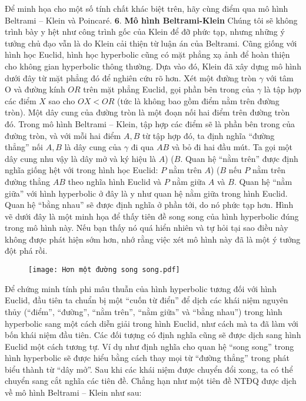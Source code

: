 \documentclass{article}
\begin{document}
	\vskip 0.1cm
	Để minh họa cho một số tính chất khác biệt trên, hãy cùng điểm qua mô hình Beltrami -- Klein và Poincaré.  
	\vskip 0.1cm
	$\pmb{6. }$ \textbf{\color{lichsutoanhoc}Mô hình Beltrami-Klein}
	\vskip 0.1cm
	Chúng tôi sẽ không trình bày y hệt như công trình gốc của Klein để đỡ phức tạp, nhưng những ý tưởng chủ đạo vẫn là do Klein cải thiện từ luận án của Beltrami.
	Cũng giống với hình học Euclid, hình học hyperbolic cũng có mặt phẳng xạ ảnh để hoàn thiện cho không gian hyperbolic thông thường. Dựa vào đó, Klein đã xây dựng mô hình dưới đây từ mặt phẳng đó để nghiên cứu rõ hơn.
	Xét một đường tròn $\gamma$ với tâm O và đường kính $OR$ trên mặt phẳng Euclid, gọi phần bên trong của $ \gamma$ là tập hợp các điểm $X$ sao cho $OX < OR$ (tức là không bao gồm điểm nằm trên đường tròn). Một dây cung của đường tròn là một đoạn nối hai điểm trên đường tròn đó.
	Trong mô hình Beltrami -- Klein, tập hợp các điểm sẽ là phần bên trong của đường tròn, và với mỗi hai điểm $A, B$ từ tập hợp đó, ta định nghĩa ``đường thẳng'' nối $A, B$ là dây cung của $ \gamma$ đi qua $AB$ và bỏ đi hai đầu mút. Ta gọi một dây cung nhu vậy là dây mở và ký hiệu là $A$) ($B$. Quan hệ ``nằm trên'' được định nghĩa giống hệt với trong hình học Euclid: $P$ nằm trên $A$) ($B$ nếu $P$ nằm trên đường thẳng $AB$ theo nghĩa hình Euclid và $P$ nằm giữa $A$ và $B$. Quan hệ ``nằm giữa'' với hình hyperbolic ở đây là y như quan hệ nằm giữa trong hình Euclid. Quan hệ ``bằng nhau'' sẽ được định nghĩa ở phần tới, do nó phức tạp hơn.
	Hình vẽ dưới đây là một minh họa để thấy tiên đề song song của hình hyperbolic đúng trong mô hình này. Nếu bạn thấy nó quá hiển nhiên và tự hỏi tại sao điều này không được phát hiện sớm hơn, nhớ rằng việc xét mô hình này đã là một ý tưởng đột phá rồi. 
	\begin{figure}[H]
		\vspace*{-5pt}
		\centering
		\captionsetup{labelformat= empty, justification=centering}
		\texttt{[image: Hơn một đường song song.pdf]}
		\vspace*{-10pt}
	\end{figure}
	Để chứng minh tính phi mâu thuẫn của hình hyperbolic tương đối với hình Euclid, đầu tiên ta chuẩn bị một ``cuốn từ điển'' để dịch các khái niệm nguyên thủy (``điểm'', ``đường'', ``nằm trên'', ``nằm giữa'' và ``bằng nhau'') trong hình hyperbolic sang một cách diễn giải trong hình Euclid, như cách mà ta đã làm với bốn khái niệm đầu tiên. Các đối tượng có định nghĩa cũng sẽ được dịch sang hình Euclid một cách tương tự. Ví dụ như định nghĩa cho quan hệ ``song song'' trong hình hyperbolic sẽ được hiểu bằng cách thay mọi từ ``đường thẳng'' trong phát biểu thành từ ``dây mở''. Sau khi các khái niệm được chuyển đổi xong, ta có thể chuyển sang cắt nghĩa các tiên đề. Chẳng hạn như một tiên đề NTĐQ được dịch về mô hình Beltrami -- Klein như sau:
\end{document}
